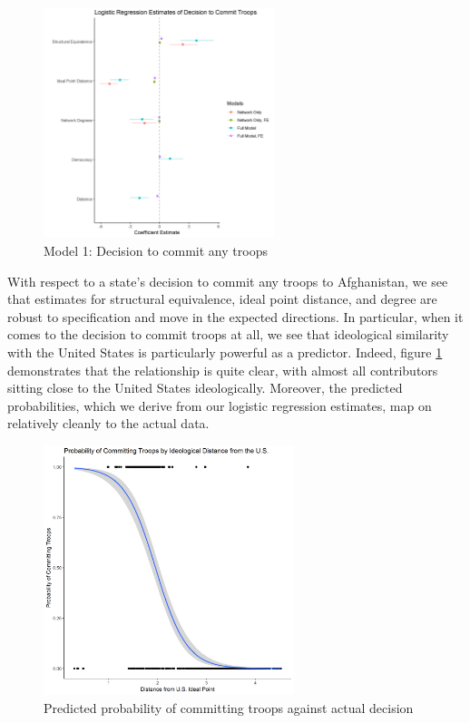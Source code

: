 \documentclass[12pt,letterpaper]{article}
\begin{document}
			\begin{figure}[H]
				\centering
					\includegraphics[width=0.6\textwidth]{logit_coef.png}
				\caption{Model 1: Decision to commit any troops}
				\label{fig:logit_reg}
			\end{figure}


			With respect to a state's decision to commit any troops to Afghanistan, we see that estimates for structural equivalence, ideal point distance, and degree are robust to specification and move in the expected directions. In particular, when it comes to the decision to commit troops at all, we see that ideological similarity with the United States is particularly powerful as a predictor. Indeed, figure \ref{fig:logit_reg} demonstrates that the relationship is quite clear, with almost all contributors sitting close to the United States ideologically. Moreover, the predicted probabilities, which we derive from our logistic regression estimates, map on relatively cleanly to the actual data.



			\begin{figure}[H]
			\centering
				\includegraphics[width=0.65\textwidth]{logit.png}
			\caption{Predicted probability of committing troops against actual decision}
			\label{fig:logit}
			\end{figure}
\end{document}
